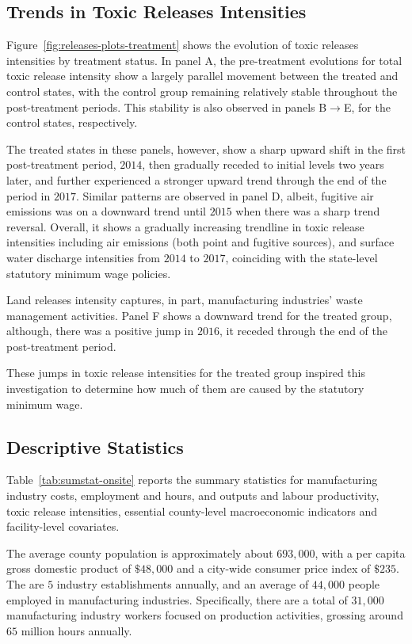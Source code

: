 \documentclass[authoryear, preprint, twocolumn, 1p]{elsarticle}
\begin{document}
    \subsection{Trends in Toxic Releases Intensities}\label{subsec:trends-in-toxic-releases-intensities}
    Figure~\ref{fig:releases-plots-treatment} shows the evolution of toxic releases intensities by treatment status. In panel A, the pre-treatment evolutions for total toxic release intensity show a largely parallel movement between the treated and control states, with the control group remaining relatively stable throughout the post-treatment periods. This stability is also observed in panels B$\rightarrow$E, for the control states, respectively.

    The treated states in these panels, however, show a sharp upward shift in the first post-treatment period, $2014$, then gradually receded to initial levels two years later, and further experienced a stronger upward trend through the end of the period in $2017$. Similar patterns are observed in panel D, albeit, fugitive air emissions was on a downward trend until $2015$ when there was a sharp trend reversal. Overall, it shows a gradually increasing trendline in toxic release intensities including air emissions (both point and fugitive sources), and surface water discharge intensities from $2014$ to $2017$, coinciding with the state-level statutory minimum wage policies.

    Land releases intensity captures, in part, manufacturing industries' waste management activities. Panel F shows a downward trend for the treated group, although, there was a positive jump in $2016$, it receded through the end of the post-treatment period.

    These jumps in toxic release intensities for the treated group inspired this investigation to determine how much of them are caused by the statutory minimum wage.
    

    \subsection{Descriptive Statistics}\label{subsec:descriptive-statistics}
    Table~\ref{tab:sumstat-onsite} reports the summary statistics for manufacturing industry costs, employment and hours, and outputs and labour productivity, toxic release intensities, essential county-level macroeconomic indicators and facility-level covariates.

    The average county population is approximately about $693,000$, with a per capita gross domestic product of $\$48,000$ and a city-wide consumer price index of $\$235$. The are $5$ industry establishments annually, and an average of $44,000$ people employed in manufacturing industries. Specifically, there are a total of $31,000$ manufacturing industry workers focused on production activities, grossing around $65$ million hours annually.
\end{document}
